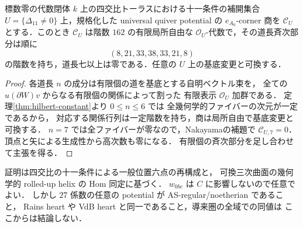 \begin{corollary}
\label{cor:flat-corner-162}
標数零の代数閉体 $k$ 上の四交比トーラスにおける十一条件の補開集合
$U=\{\Delta_{11}\ne0\}$ 上，規格化した universal quiver potential の
$e_{A_0}$-corner 商を $\mathcal C_U$ とする．このとき
$\mathcal C_U$ は階数 $162$ の有限局所自由な
$\mathcal O_U$-代数で，その道長斉次部分は順に
\[
 (8,21,33,38,33,21,8)
\]
の階数を持ち，道長七以上は零である．任意の $U$ 上の基底変更と可換する．
\end{corollary}
\begin{proof}
各道長 $n$ の成分は有限個の道を基底とする自明ベクトル束を，
全ての $u(\partial W)v$ からなる有限個の関係によって割った
有限表示 $\mathcal O_U$ 加群である．
定理\ref{thm:hilbert-constant}より $0\le n\le6$ では
全幾何学的ファイバーの次元が一定であるから，
対応する関係行列は一定階数を持ち，商は局所自由で基底変更と可換する．
$n=7$ では全ファイバーが零なので，Nakayamaの補題で
$\mathcal C_{U,7}=0$．頂点と矢による生成性から高次数も零になる．
有限個の斉次部分を足し合わせて主張を得る．
\end{proof}

\begin{remark}[結果の対象範囲]\label{rem:hilbert-status}
証明は四交比の十一条件による一般位置六点の再構成と，
可換三次曲面の幾何学的 rolled-up helix の Hom 同定に基づく．
$w_{0bc}$ は $C$ に影響しないので任意でよい．
しかし $27$ 係数の任意の potential が AS-regular/noetherian であること，
Rains heart や VdB heart と同一であること，導来圏の全域での同値は
ここからは結論しない．
\end{remark}
